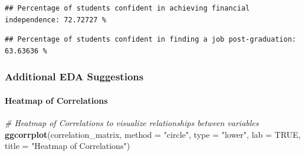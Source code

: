 \documentclass[
]{article}
\newenvironment{Shaded}{\begin{snugshade}}{\end{snugshade}}
\newcommand{\AttributeTok}[1]{\textcolor[rgb]{0.13,0.29,0.53}{#1}}
\newcommand{\CommentTok}[1]{\textcolor[rgb]{0.56,0.35,0.01}{\textit{#1}}}
\newcommand{\ConstantTok}[1]{\textcolor[rgb]{0.56,0.35,0.01}{#1}}
\newcommand{\DecValTok}[1]{\textcolor[rgb]{0.00,0.00,0.81}{#1}}
\newcommand{\FunctionTok}[1]{\textcolor[rgb]{0.13,0.29,0.53}{\textbf{#1}}}
\newcommand{\NormalTok}[1]{#1}
\newcommand{\OtherTok}[1]{\textcolor[rgb]{0.56,0.35,0.01}{#1}}
\newcommand{\SpecialCharTok}[1]{\textcolor[rgb]{0.81,0.36,0.00}{\textbf{#1}}}
\newcommand{\StringTok}[1]{\textcolor[rgb]{0.31,0.60,0.02}{#1}}
\begin{document}
\begin{verbatim}
## Percentage of students confident in achieving financial independence: 72.72727 %
\end{verbatim}

\begin{Shaded}
\end{Shaded}

\begin{verbatim}
## Percentage of students confident in finding a job post-graduation: 63.63636 %
\end{verbatim}

\subsubsection{Additional EDA
Suggestions}\label{additional-eda-suggestions}

\paragraph{Heatmap of Correlations}\label{heatmap-of-correlations}

\begin{Shaded}
\begin{Highlighting}[]
\CommentTok{\# Heatmap of Correlations to visualize relationships between variables}
\FunctionTok{ggcorrplot}\NormalTok{(correlation\_matrix, }\AttributeTok{method =} \StringTok{"circle"}\NormalTok{, }\AttributeTok{type =} \StringTok{"lower"}\NormalTok{, }\AttributeTok{lab =} \ConstantTok{TRUE}\NormalTok{, }\AttributeTok{title =} \StringTok{"Heatmap of Correlations"}\NormalTok{)}
\end{Highlighting}
\end{Shaded}
\end{document}
